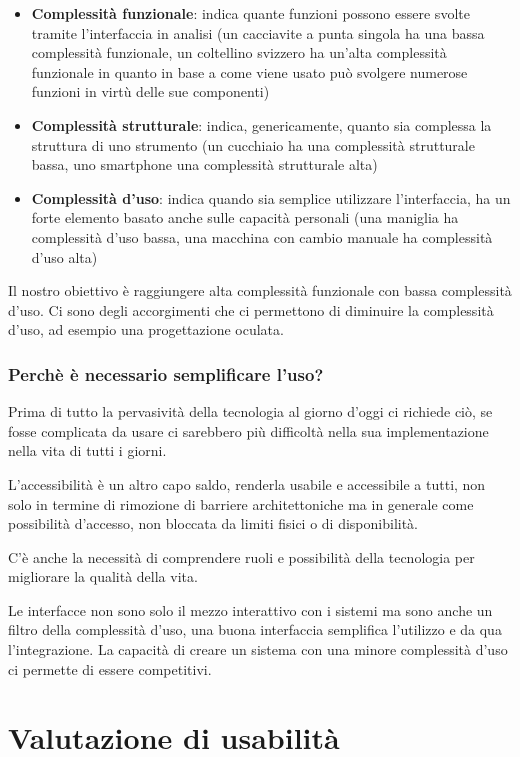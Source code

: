 \documentclass[11pt,a4paper]{book}
\begin{document}
\begin{itemize}
	\item \textbf{Complessità funzionale}: indica quante funzioni possono essere svolte tramite l'interfaccia in analisi (un cacciavite a punta singola ha una bassa complessità funzionale, un coltellino svizzero ha un'alta complessità funzionale in quanto in base a come viene usato può svolgere numerose funzioni in virtù delle sue componenti)
	\item \textbf{Complessità strutturale}: indica, genericamente, quanto sia complessa la struttura di uno strumento (un cucchiaio ha una complessità strutturale bassa, uno smartphone una complessità strutturale alta)
	\item \textbf{Complessità d'uso}: indica quando sia semplice utilizzare l'interfaccia, ha un forte elemento basato anche sulle capacità personali (una maniglia ha complessità d'uso bassa, una macchina con cambio manuale ha complessità d'uso alta)
\end{itemize}

Il nostro obiettivo è raggiungere alta complessità funzionale con bassa complessità d'uso. Ci sono degli accorgimenti che ci permettono di diminuire la complessità d'uso, ad esempio una progettazione oculata.

\subsection{Perchè è necessario semplificare l'uso?}
Prima di tutto la pervasività della tecnologia al giorno d'oggi ci richiede ciò, se fosse complicata da usare ci sarebbero più difficoltà nella sua implementazione nella vita di tutti i giorni.

L'accessibilità è un altro capo saldo, renderla usabile e accessibile a tutti, non solo in termine di rimozione di barriere architettoniche ma in generale come possibilità d'accesso, non bloccata da limiti fisici o di disponibilità.

C'è anche la necessità di comprendere ruoli e possibilità della tecnologia per migliorare la qualità della vita.

Le interfacce non sono solo il mezzo interattivo con i sistemi ma sono anche un filtro della complessità d'uso, una buona interfaccia semplifica l'utilizzo e da qua l'integrazione. La capacità di creare un sistema con una minore complessità d'uso ci permette di essere competitivi.

\chapter{Valutazione di usabilità}
\end{document}
